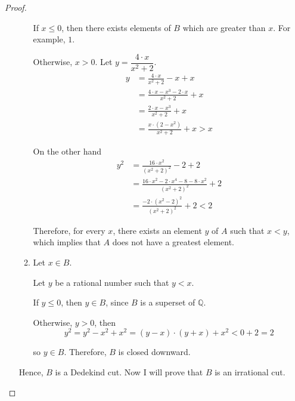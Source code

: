 \begin{proof}
\begin{itemize}[topsep=0pt]
\begin{enumerate}[label={(\roman*)},topsep=0pt]
                        If $x\le 0$, then there exists elements of $B$ which are greater than $x$. For example, $1$.

                        Otherwise, $x > 0$. Let $y = \dfrac{4\cdot x}{{x}^{2} + 2}$.
                        \begin{align*}
                            y & = \frac{4\cdot x}{{x}^{2} + 2} - x + x                  \\
                              & = \frac{4\cdot x - {x}^{3} - 2\cdot x}{{x}^{2} + 2} + x \\
                              & = \frac{2\cdot x - {x}^{3}}{{x}^{2} + 2} + x            \\
                              & = \frac{x\cdot (2 - {x}^{2})}{{x}^{2} + 2} + x > x
                        \end{align*}

                        On the other hand
                        \begin{align*}
                            {y}^{2} & = \frac{16\cdot {x}^{2}}{{({x}^{2} + 2)}^{2}} - 2 + 2                                  \\
                                    & = \frac{16\cdot {x}^{2} - 2\cdot{x}^{4} - 8 - 8\cdot {x}^{2}}{{({x}^{2} + 2)}^{2}} + 2 \\
                                    & = \frac{-2\cdot {({x}^{2} - 2)}^{2}}{{({x}^{2} + 2)}^{2}} + 2 < 2
                        \end{align*}

                        Therefore, for every $x$, there exists an element $y$ of $A$ such that $x < y$, which implies that $A$ does not have a greatest element.
                  \item Let $x\in B$.

                        Let $y$ be a rational number such that $y < x$.

                        If $y\le 0$, then $y\in B$, since $B$ is a superset of $\mathbb{Q}$.

                        Otherwise, $y > 0$, then
                        \[
                            {y}^{2} = {y}^{2} - {x}^{2} + {x}^{2} = (y - x)\cdot(y + x) + {x}^{2} < 0 + 2 = 2
                        \]

                        so $y\in B$. Therefore, $B$ is closed downward.
              \end{enumerate}

              Hence, $B$ is a Dedekind cut. Now I will prove that $B$ is an irrational cut.


\end{itemize}
\end{proof}
